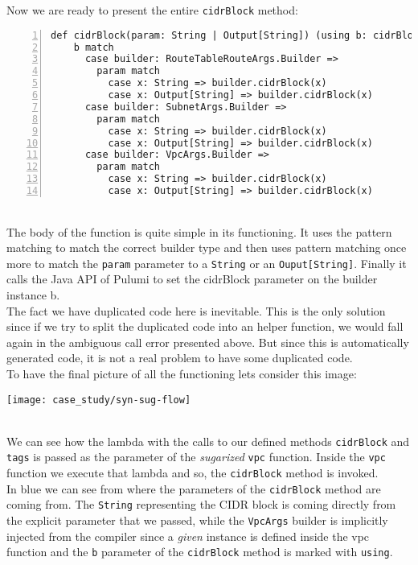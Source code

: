 Now we are ready to present the entire \texttt{cidrBlock} method:
\begin{lstlisting}[numbers=left, numberstyle=\tiny, numbersep=-5pt, stepnumber=1, linewidth=420pt]
  def cidrBlock(param: String | Output[String]) (using b: cidrBlockOwners): Unit =
    b match
      case builder: RouteTableRouteArgs.Builder =>
        param match
          case x: String => builder.cidrBlock(x)
          case x: Output[String] => builder.cidrBlock(x)
      case builder: SubnetArgs.Builder =>
        param match
          case x: String => builder.cidrBlock(x)
          case x: Output[String] => builder.cidrBlock(x)
      case builder: VpcArgs.Builder =>
        param match
          case x: String => builder.cidrBlock(x)
          case x: Output[String] => builder.cidrBlock(x)
\end{lstlisting}\mbox{}\\
The body of the function is quite simple in its functioning.
It uses the pattern matching to match the correct builder type and then uses pattern matching once more to match the \texttt{param} parameter to a \texttt{String} or an \texttt{Ouput[String]}.
Finally it calls the Java API of Pulumi to set the cidrBlock parameter on the builder instance b.\\
The fact we have duplicated code here is inevitable.
This is the only solution since if we try to split the duplicated code into an helper function, we would fall again in the ambiguous call error presented above.
But since this is automatically generated code, it is not a real problem to have some duplicated code.\\

To have the final picture of all the functioning lets consider this image:
\begin{center}
  \hspace*{-3cm}\texttt{[image: case\_study/syn-sug-flow]} 
\end{center}\mbox{}\\
We can see how the lambda with the calls to our defined methods \texttt{cidrBlock} and \texttt{tags} is passed as the  parameter of the \textit{sugarized} \texttt{vpc} function.
Inside the \texttt{vpc} function we execute that lambda and so, the \texttt{cidrBlock} method is invoked.\\
In blue we can see from where the parameters of the \texttt{cidrBlock} method are coming from.
The \texttt{String} representing the CIDR block is coming directly from the explicit parameter that we passed,
while the \texttt{VpcArgs} builder is implicitly injected from the compiler since a \textit{given} instance is defined inside the vpc function and the \texttt{b} parameter of the \texttt{cidrBlock} method is marked with \texttt{using}.

